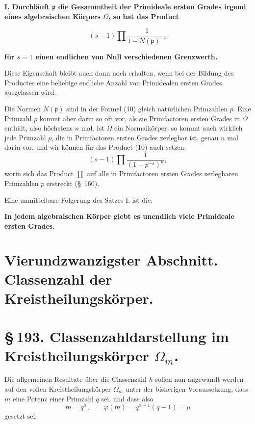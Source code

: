 \documentclass[11pt]{article}
\begin{document}
\begin{center}
\textbf{I. Durchläuft $\mathfrak p$ die Gesammtheit der Primideale ersten Grades irgend eines algebraischen Körpers $\Omega$, so hat das Product}
\end{center}
\begin{equation}
(s-1)\prod\frac1{1-N(\mathfrak p)^{-s}}
\tag{10}
\end{equation}
\begin{center}
\textbf{für $s=1$ einen endlichen von Null verschiedenen Grenzwerth.}
\end{center}

Diese Eigenschaft bleibt auch dann noch erhalten, wenn bei der Bildung des Productes eine beliebige endliche Anzahl von Primidealen ersten Grades ausgelassen wird.

Die Normen $N(\mathfrak p)$ sind in der Formel (10) gleich natürlichen Primzahlen $p$. Eine Primzahl $p$ kommt aber darin so oft vor, als sie Primfactoren ersten Grades in $\Omega$ enthält, also höchstens $n$ mal. Ist $\Omega$ ein Normalkörper, so kommt auch wirklich jede Primzahl $p$, die in Primfactoren ersten Grades zerlegbar ist, genau $n$ mal darin vor, und wir können für das Product (10) auch setzen:
\[
(s-1)\prod\frac1{(1-p^{-s})^n},
\]
worin sich das Product $\prod$ auf alle in Primfactoren ersten Grades zerlegbaren Primzahlen $p$ erstreckt (\S~160).

Eine unmittelbare Folgerung des Satzes I. ist die:
\begin{center}
\textbf{In jedem algebraischen Körper giebt es unendlich viele Primideale ersten Grades.}
\end{center}

\section*{Vierundzwanzigster Abschnitt.\\Classenzahl der Kreistheilungskörper.}
\section*{\S\,193. Classenzahldarstellung im Kreistheilungskörper $\Omega_m$.}

Die allgemeinen Resultate über die Classenzahl $h$ sollen nun angewandt werden auf den vollen Kreistheilungskörper $\Omega_m$ unter der bisherigen Voraussetzung, dass $m$ eine Potenz einer Primzahl $q$ sei, und dass also
\begin{equation}
m=q^\alpha,\qquad \varphi(m)=q^{\alpha-1}(q-1)=\mu
\tag{1}
\end{equation}
gesetzt sei.
\end{document}
